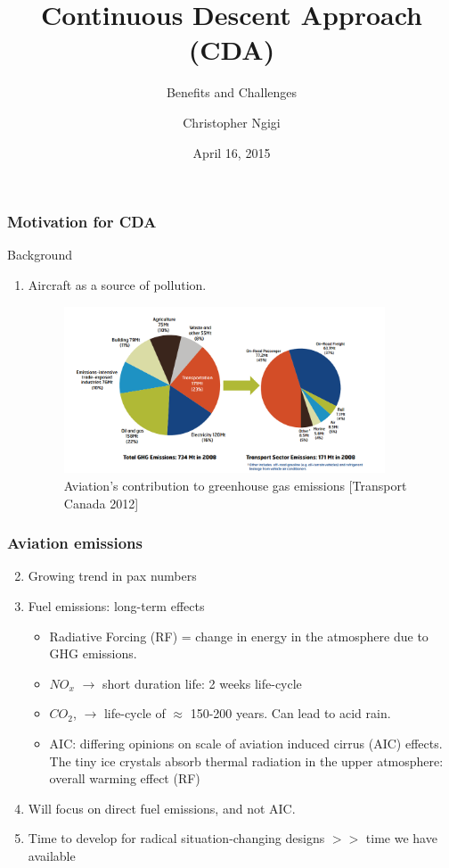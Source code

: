 \documentclass{beamer}
\title[Continuous Descent Approach \hspace{2em}\insertframenumber/\inserttotalframenumber]{Continuous Descent Approach (CDA)}
\subtitle{Benefits and Challenges}
\author{Christopher Ngigi}
\date{April 16, 2015}
\begin{document}
\addtocounter{framenumber}{-1}

\frame{\titlepage}



\begin{frame}
\frametitle{Motivation for CDA}

{\color{blue} Background}
\begin{enumerate}[1.]
\item Aircraft as a source of pollution. 

\begin{figure}[h!]
\centering
\includegraphics[width=0.9\textwidth]{./figures/TotalEmissions.png}\\
{\tiny Aviation's contribution to greenhouse gas emissions [Transport Canada 2012]}
\end{figure}
\end{enumerate}

\end{frame}



\begin{frame}
\frametitle{Aviation emissions}
\begin{enumerate}[1.]
\setcounter{enumi}{1}
\item Growing trend in pax numbers
\item Fuel emissions: long-term effects
\begin{itemize}
\item Radiative Forcing (RF) = change in energy in the atmosphere due to GHG emissions.
\item $NO_x$ $\rightarrow$ short duration life: 2 weeks life-cycle
\item $CO_2$, $\rightarrow$ life-cycle of $\approx$ 150-200 years. Can lead to acid rain.
\item AIC: differing opinions on scale of aviation induced cirrus (AIC) effects. The tiny ice crystals absorb thermal radiation in the upper atmosphere: overall warming effect (RF)
\end{itemize}

\item Will focus on direct fuel emissions, and not AIC.
\item Time to develop for radical situation-changing designs $>>$ time we have available
\end{enumerate} 

\end{frame}
\end{document}
